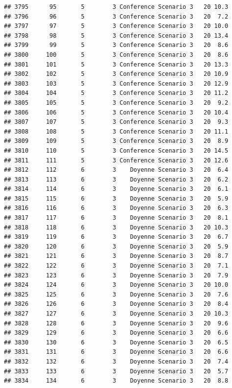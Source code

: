 \documentclass[
]{article}
\begin{document}
\begin{verbatim}
## 3795      95       5        3 Conference Scenario 3   20 10.3
## 3796      96       5        3 Conference Scenario 3   20  7.2
## 3797      97       5        3 Conference Scenario 3   20 10.0
## 3798      98       5        3 Conference Scenario 3   20 13.4
## 3799      99       5        3 Conference Scenario 3   20  8.6
## 3800     100       5        3 Conference Scenario 3   20  8.6
## 3801     101       5        3 Conference Scenario 3   20 13.3
## 3802     102       5        3 Conference Scenario 3   20 10.9
## 3803     103       5        3 Conference Scenario 3   20 12.9
## 3804     104       5        3 Conference Scenario 3   20 11.2
## 3805     105       5        3 Conference Scenario 3   20  9.2
## 3806     106       5        3 Conference Scenario 3   20 10.4
## 3807     107       5        3 Conference Scenario 3   20  9.3
## 3808     108       5        3 Conference Scenario 3   20 11.1
## 3809     109       5        3 Conference Scenario 3   20  8.9
## 3810     110       5        3 Conference Scenario 3   20 14.5
## 3811     111       5        3 Conference Scenario 3   20 12.6
## 3812     112       6        3    Doyenne Scenario 3   20  6.4
## 3813     113       6        3    Doyenne Scenario 3   20  6.2
## 3814     114       6        3    Doyenne Scenario 3   20  6.1
## 3815     115       6        3    Doyenne Scenario 3   20  5.9
## 3816     116       6        3    Doyenne Scenario 3   20  6.3
## 3817     117       6        3    Doyenne Scenario 3   20  8.1
## 3818     118       6        3    Doyenne Scenario 3   20 10.3
## 3819     119       6        3    Doyenne Scenario 3   20  6.7
## 3820     120       6        3    Doyenne Scenario 3   20  5.9
## 3821     121       6        3    Doyenne Scenario 3   20  8.7
## 3822     122       6        3    Doyenne Scenario 3   20  7.1
## 3823     123       6        3    Doyenne Scenario 3   20  7.9
## 3824     124       6        3    Doyenne Scenario 3   20 10.0
## 3825     125       6        3    Doyenne Scenario 3   20  7.6
## 3826     126       6        3    Doyenne Scenario 3   20  8.4
## 3827     127       6        3    Doyenne Scenario 3   20 10.3
## 3828     128       6        3    Doyenne Scenario 3   20  9.6
## 3829     129       6        3    Doyenne Scenario 3   20  6.6
## 3830     130       6        3    Doyenne Scenario 3   20  6.5
## 3831     131       6        3    Doyenne Scenario 3   20  6.6
## 3832     132       6        3    Doyenne Scenario 3   20  7.4
## 3833     133       6        3    Doyenne Scenario 3   20  5.7
## 3834     134       6        3    Doyenne Scenario 3   20  8.8

\end{verbatim}
\end{document}

